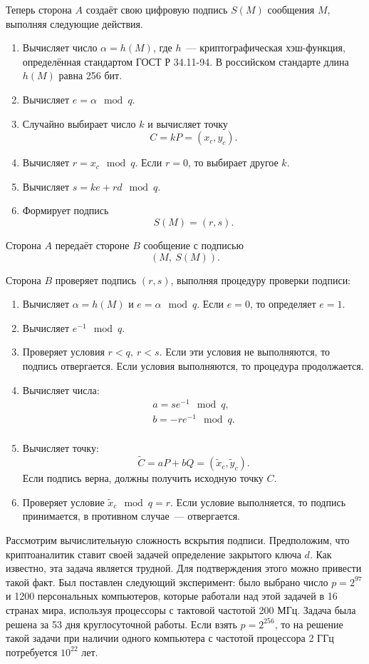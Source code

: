 Теперь сторона $A$ создаёт свою цифровую подпись $S(M)$ сообщения $M$, выполняя следующие действия.
\begin{enumerate}
    \item Вычисляет число $\alpha = h(M)$, где $h$~--- криптографическая хэш-функция, определённая стандартом ГОСТ Р 34.11-94. В российском стандарте длина $h(M)$ равна 256 бит.
    \item Вычисляет $e = \alpha \mod q$.
    \item Случайно выбирает число $k$ и вычисляет точку
        \[ C = k P = (x_c, y_c). \]
    \item Вычисляет $r = x_c \mod q$.
	Если $r = 0$, то выбирает другое $k$.
    \item Вычисляет $s = k e + r d \mod q$.
    \item Формирует подпись
        \[ S(M) = (r, s). \]
\end{enumerate}
Сторона $A$ передаёт стороне $B$ сообщение с подписью
    \[ (M, ~ S(M)). \]

Сторона $B$ проверяет подпись $(r,s)$, выполняя процедуру проверки подписи:
\begin{enumerate}
    \item Вычисляет $\alpha = h(M)$ и $e = \alpha \mod q$. Если $e = 0$, то определяет $e = 1$.
    \item Вычисляет $e^{-1} \mod q$.
    \item Проверяет условия $r < q, ~ r < s$. Если эти условия не выполняются, то подпись отвергается. Если условия выполняются, то процедура продолжается.
    \item Вычисляет числа:
        \[ \begin{array}{l}
            a = s e^{-1} \mod q, \\
            b = -r e^{-1} \mod q. \\
        \end{array} \]
    \item Вычисляет точку:
        \[ \tilde{C} = a P + b Q = (\tilde{x}_c, \tilde{y}_c). \]
        Если подпись верна, должны получить исходную точку $C$.
    \item Проверяет условие $\tilde{x}_{c} \mod q = r$. Если условие выполняется, то подпись принимается, в противном случае~--- отвергается.
\end{enumerate}

Рассмотрим вычислительную сложность вскрытия подписи. Предположим, что криптоаналитик ставит своей задачей определение закрытого ключа $d$. Как известно, эта задача является трудной. Для подтверждения этого можно привести такой факт. Был поставлен следующий эксперимент: было выбрано число $p = 2^{97}$ и 1200 персональных компьютеров, которые работали над этой задачей в 16 странах мира, используя процессоры с тактовой частотой 200 МГц. Задача была решена за 53 дня круглосуточной работы. Если взять $p = 2^{256}$, то на решение такой задачи при наличии одного компьютера с частотой процессора 2 ГГц потребуется $10^{22}$ лет.

